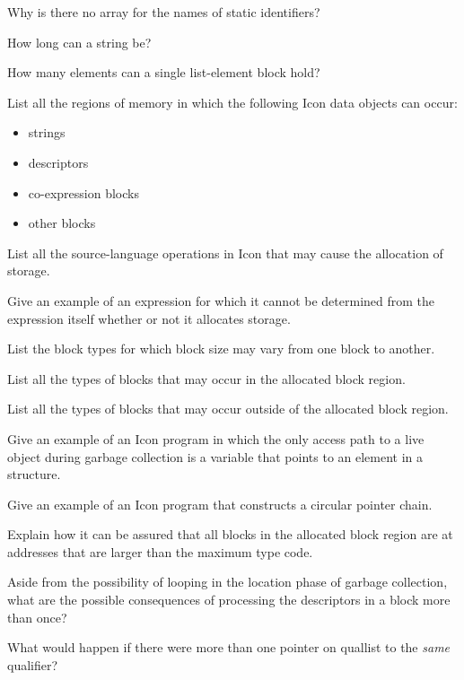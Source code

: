 Why is there no array for the names of static identifiers?

How long can a string be?

How many elements can a single list-element block hold?

List all the regions of memory in which the
following Icon data objects can occur:
\begin{itemize}
\item 
strings
\item 
descriptors
\item 
co-expression blocks
\item 
other blocks
\end{itemize}

List all the source-language operations in Icon
that may cause the allocation of storage.

Give an example of an expression for which it
cannot be determined from the expression itself whether or not it
allocates storage.

List the block types for which block size may
vary from one block to another.

List all the types of blocks that may occur in
the allocated block region.

List all the types of blocks that may occur
outside of the allocated block region.

Give an example of an Icon program in which the
only access path to a live object during garbage collection is a
variable that points to an element in a structure.

Give an example of an Icon program that
constructs a circular pointer chain.

Explain how it can be assured that all blocks in
the allocated block region are at addresses that are larger than the
maximum type code.

Aside from the possibility of looping in the
location phase of garbage collection, what are the possible
consequences of processing the descriptors in a block more than once?

What would happen if there were more than one
pointer on quallist to the \textit{same} qualifier?

